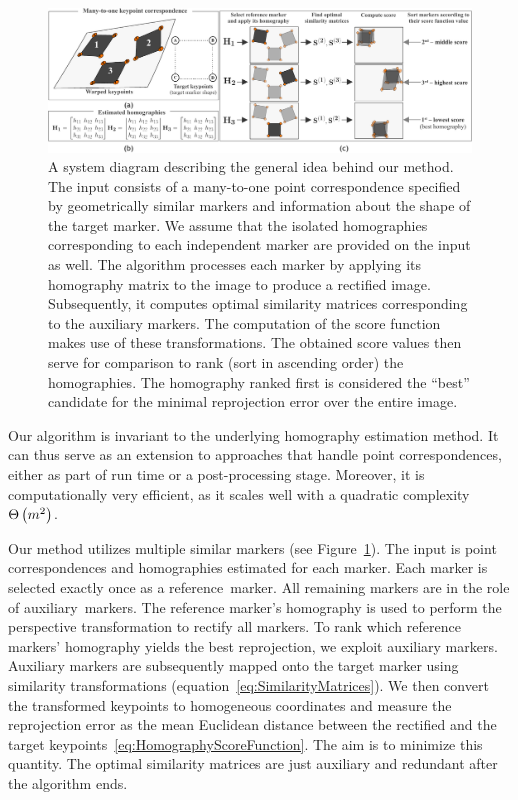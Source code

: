 \begin{figure}[t]
    \centerline{\includegraphics[width=\linewidth]{figures/homography/system_diagram.pdf}}
    \caption[Homography ranking system diagram]{A system diagram describing the general idea behind our method.  The input consists of a many-to-one point correspondence specified by geometrically similar markers and information about the shape of the target marker.  We assume that the isolated homographies corresponding to each independent marker are provided on the input as well.  The algorithm processes each marker by applying its homography matrix to the image to produce a rectified image. Subsequently, it computes optimal similarity matrices corresponding to the auxiliary markers. The computation of the score function makes use of these transformations. The obtained score values then serve for comparison to rank (sort in ascending order) the homographies. The homography ranked first is considered the ``best'' candidate for the minimal reprojection error over the entire image.}
    \label{fig:HomographySystemDiagram}
\end{figure}

Our algorithm is invariant to the underlying homography estimation method. It can thus serve as an extension to approaches that handle point correspondences, either as part of run time or a post-processing stage. Moreover, it is computationally very efficient, as it scales well with a quadratic complexity ${\Theta} \left( m^2 \right)$.

Our method utilizes multiple similar markers (see Figure~\ref{fig:HomographySystemDiagram}). The input is point correspondences and homographies estimated for each marker. Each marker is selected exactly once as a \mbox{reference marker}. All remaining markers are in the role of \mbox{auxiliary markers}. The reference marker's homography is used to perform the perspective transformation to rectify all markers. To rank which reference markers' homography yields the best reprojection, we exploit auxiliary markers. Auxiliary markers are subsequently mapped onto the target marker using similarity transformations (equation~\eqref{eq:SimilarityMatrices}). We then convert the transformed keypoints to homogeneous coordinates and measure the reprojection error as the mean Euclidean distance between the rectified and the target keypoints~\eqref{eq:HomographyScoreFunction}. The aim is to minimize this quantity. The optimal similarity matrices are just auxiliary and redundant after the algorithm ends.

